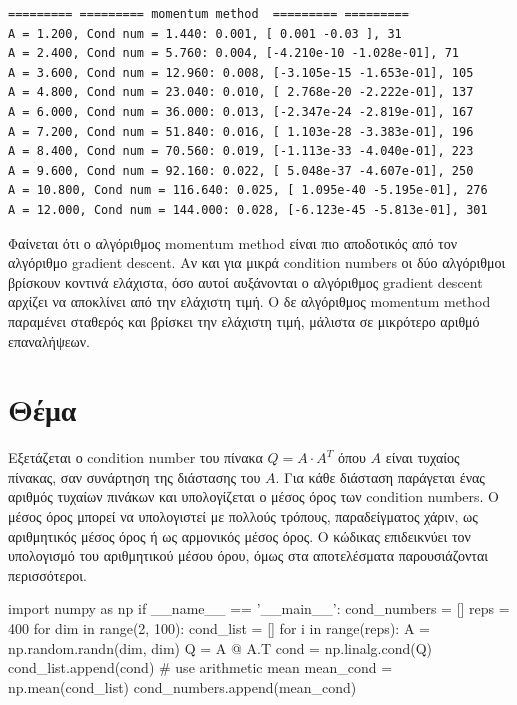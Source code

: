\documentclass{article}
\newcommand{\eng}[1]{\foreignlanguage{english}{#1}} %
\begin{document}
\begin{verbatim}
========= ========= momentum method  ========= =========
A = 1.200, Cond num = 1.440: 0.001, [ 0.001 -0.03 ], 31
A = 2.400, Cond num = 5.760: 0.004, [-4.210e-10 -1.028e-01], 71
A = 3.600, Cond num = 12.960: 0.008, [-3.105e-15 -1.653e-01], 105
A = 4.800, Cond num = 23.040: 0.010, [ 2.768e-20 -2.222e-01], 137
A = 6.000, Cond num = 36.000: 0.013, [-2.347e-24 -2.819e-01], 167
A = 7.200, Cond num = 51.840: 0.016, [ 1.103e-28 -3.383e-01], 196
A = 8.400, Cond num = 70.560: 0.019, [-1.113e-33 -4.040e-01], 223
A = 9.600, Cond num = 92.160: 0.022, [ 5.048e-37 -4.607e-01], 250
A = 10.800, Cond num = 116.640: 0.025, [ 1.095e-40 -5.195e-01], 276
A = 12.000, Cond num = 144.000: 0.028, [-6.123e-45 -5.813e-01], 301
\end{verbatim}

Φαίνεται ότι ο αλγόριθμος \eng{momentum method} είναι πιο αποδοτικός από τον
αλγόριθμο \eng{gradient descent}. Αν και για μικρά \eng{condition numbers} οι
δύο αλγόριθμοι βρίσκουν κοντινά ελάχιστα, όσο αυτοί αυξάνονται ο αλγόριθμος
\eng{gradient descent} αρχίζει να αποκλίνει από την ελάχιστη τιμή.
Ο δε αλγόριθμος \eng{momentum method} παραμένει σταθερός και βρίσκει την
ελάχιστη τιμή, μάλιστα σε μικρότερο αριθμό επαναλήψεων.

\clearpage
\section{Θέμα}

Εξετάζεται ο \eng{condition number} του πίνακα $Q = A \cdot A^T$ όπου $A$ είναι
τυχαίος πίνακας, σαν συνάρτηση της διάστασης του $A$. Για κάθε διάσταση
παράγεται ένας αριθμός τυχαίων πινάκων και υπολογίζεται ο μέσος όρος των
\eng{condition numbers}. Ο μέσος όρος μπορεί να υπολογιστεί με πολλούς τρόπους,
παραδείγματος χάριν, ως αριθμητικός μέσος όρος ή ως αρμονικός μέσος όρος. Ο
κώδικας επιδεικνύει τον υπολογισμό του αριθμητικού μέσου όρου, όμως στα
αποτελέσματα παρουσιάζονται περισσότεροι.

\begin{python}
import numpy as np
if __name__ == '__main__':
    cond_numbers = []
    reps = 400
    for dim in range(2, 100):
        cond_list = []
        for i in range(reps):
            A = np.random.randn(dim, dim)
            Q = A @ A.T
            cond = np.linalg.cond(Q)
            cond_list.append(cond)
        # use arithmetic mean
        mean_cond = np.mean(cond_list)
        cond_numbers.append(mean_cond)
\end{python}
\end{document}
